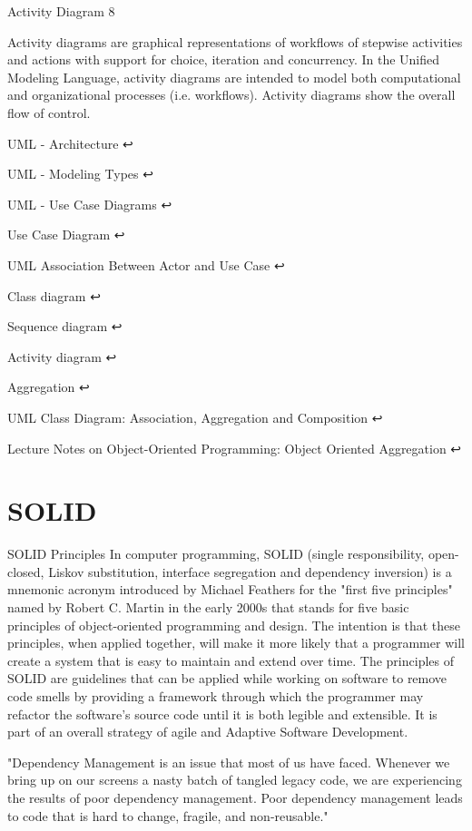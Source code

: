 Activity Diagram
8

Activity diagrams are graphical representations of workflows of stepwise activities and actions with support for choice, iteration and concurrency. In the Unified Modeling Language, activity diagrams are intended to model both computational and organizational processes (i.e. workflows). Activity diagrams show the overall flow of control.



UML - Architecture ↩

UML - Modeling Types ↩

UML - Use Case Diagrams ↩

Use Case Diagram ↩

UML Association Between Actor and Use Case ↩

Class diagram ↩

Sequence diagram ↩

Activity diagram ↩

Aggregation ↩

UML Class Diagram: Association, Aggregation and Composition ↩

Lecture Notes on Object-Oriented Programming: Object Oriented Aggregation ↩


\section{SOLID}

SOLID Principles
In computer programming, SOLID (single responsibility, open-closed, Liskov substitution, interface segregation and dependency inversion) is a mnemonic acronym introduced by Michael Feathers for the "first five principles" named by Robert C. Martin in the early 2000s that stands for five basic principles of object-oriented programming and design. The intention is that these principles, when applied together, will make it more likely that a programmer will create a system that is easy to maintain and extend over time. The principles of SOLID are guidelines that can be applied while working on software to remove code smells by providing a framework through which the programmer may refactor the software's source code until it is both legible and extensible. It is part of an overall strategy of agile and Adaptive Software Development.

"Dependency Management is an issue that most of us have faced. Whenever we bring up on our screens a nasty batch of tangled legacy code, we are experiencing the results of poor dependency management. Poor dependency management leads to code that is hard to change, fragile, and non-reusable."

